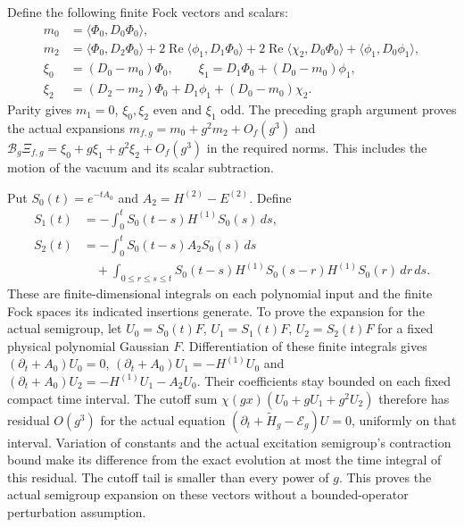 Define the following finite Fock vectors and scalars:
\begin{align}
 m_0&=\langle\Phi_0,D_0\Phi_0\rangle,\nonumber\\
 m_2&=\langle\Phi_0,D_2\Phi_0\rangle
       +2\operatorname{Re}\langle\phi_1,D_1\Phi_0\rangle
       +2\operatorname{Re}\langle\chi_2,D_0\Phi_0\rangle
       +\langle\phi_1,D_0\phi_1\rangle,\nonumber\\
 \xi_0&=(D_0-m_0)\Phi_0,\qquad
 \xi_1=D_1\Phi_0+(D_0-m_0)\phi_1,\nonumber\\
 \xi_2&=(D_2-m_2)\Phi_0+D_1\phi_1+(D_0-m_0)\chi_2.
       \label{eq:vertex-local-state-coefficients}
\end{align}
Parity gives $m_1=0$, $\xi_0,\xi_2$ even and $\xi_1$ odd.
The preceding graph argument proves the actual expansions
$m_{f,g}=m_0+g^2m_2+O_f(g^3)$ and
$\mathcal B_g\Xi_{f,g}=\xi_0+g\xi_1+g^2\xi_2+O_f(g^3)$
in the required norms. This includes the motion of the vacuum and
its scalar subtraction.

Put $S_0(t)=e^{-tA_0}$ and $A_2=H^{(2)}-E^{(2)}$. Define
\begin{align}
 S_1(t)&=-\int_0^t S_0(t-s)H^{(1)}S_0(s)\,ds,\nonumber\\
 S_2(t)&=-\int_0^t S_0(t-s)A_2S_0(s)\,ds\nonumber\\
 &\quad+\int_{0\le r\le s\le t}
 S_0(t-s)H^{(1)}S_0(s-r)H^{(1)}S_0(r)\,dr\,ds .
       \label{eq:vertex-semigroup-coefficients}
\end{align}
These are finite-dimensional integrals on each polynomial input and
the finite Fock spaces its indicated insertions generate. To prove
the expansion for the actual semigroup, let $U_0=S_0(t)F$,
$U_1=S_1(t)F$, $U_2=S_2(t)F$ for a fixed physical polynomial
Gaussian $F$. Differentiation of these finite integrals gives
$(\partial_t+A_0)U_0=0$,
$(\partial_t+A_0)U_1=-H^{(1)}U_0$ and
$(\partial_t+A_0)U_2=-H^{(1)}U_1-A_2U_0$.
Their coefficients stay bounded on each fixed compact time interval.
The cutoff sum $\chi(gx)(U_0+gU_1+g^2U_2)$ therefore has residual
$O(g^3)$ for the actual equation
$(\partial_t+\widetilde H_g-\mathcal E_g)U=0$, uniformly on
that interval. Variation of constants and the actual excitation
semigroup's contraction bound make its difference from the exact
evolution at most the time integral of this residual. The cutoff
tail is smaller than every power of $g$. This proves the actual
semigroup expansion on these vectors without a bounded-operator
perturbation assumption.

